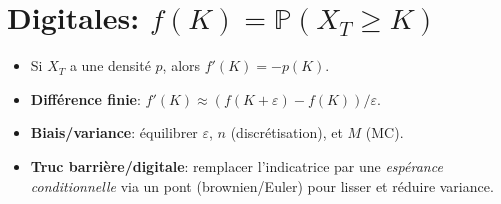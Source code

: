 \documentclass[11pt,a4paper]{article}
\newcommand{\Pp}{\mathbb{P}}
\newcommand{\1}{\mathbbm{1}}
\theoremstyle{plain}
\theoremstyle{definition}
\begin{document}
\section{Digitales: $f(K)=\Pp(X_T\ge K)$}
\begin{itemize}[leftmargin=*]
  \item Si $X_T$ a une densité $p$, alors $f'(K)=-p(K)$.
  \item \textbf{Différence finie}: $f'(K)\approx (f(K+\varepsilon)-f(K))/\varepsilon$.
  \item \textbf{Biais/variance}: équilibrer $\varepsilon$, $n$ (discrétisation), et $M$ (MC).
  \item \textbf{Truc barrière/digitale}: remplacer l'indicatrice par une \emph{espérance conditionnelle} via un pont (brownien/Euler) pour lisser et réduire variance.
\end{itemize}
\end{document}
